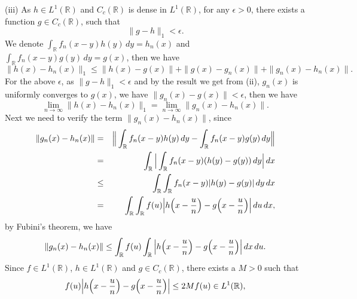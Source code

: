 \documentclass[12pt,a4paper]{ctexart}
\begin{document}
\vspace{4pt}

(iii) As $h \in L^{1}(\mathbb{R})$ and $C_{c} (\mathbb{R})$ is dense in $L^{1} (\mathbb{R})$, for any $\epsilon > 0$, there exists  a function $g \in C_{c}(\mathbb{R})$, such that
\begin{equation*}
    \|g - h\|_{1} < \epsilon.
\end{equation*}
We denote $\int_{\mathbb{R}}^{} f_{n} (x - y) h(y) \, d y = h_{n}(x)$ and $\int_{\mathbb{R}}^{} f_{n} (x - y) g(y) \, d y = g(x)$, then we have
\begin{equation*}
    \|h(x) - h_{n}(x)\|_{1} \leq \|h(x) - g(x)\| + \|g(x) - g_{n}(x)\| + \|g_{n}(x) - h_{n}(x)\|.
\end{equation*}
For the above $\epsilon$, as $\|g - h\|_{1} < \epsilon$ and by the result we get from (ii), $g_{n}(x)$ is uniformly converges to $g(x)$, we have $\|g_{n}(x) - g(x)\| < \epsilon$, then we have
\begin{equation*}
    \lim_{n \to \infty} \|h(x) - h_{n}(x)\|_{1} = \lim_{n \to \infty} \|g_{n}(x) - h_{n}(x)\|.
\end{equation*}
Next we need to verify the term $\|g_{n}(x) - h_{n}(x)\|$, since
\begin{eqnarray*}
    \|g_{n}(x) - h_{n}(x)\| & = & \Big{\|} \int_{\mathbb{R}}^{} f_{n} (x - y) h(y) \, d y - \int_{\mathbb{R}}^{} f_{n} (x - y) g(y) \, d y \Big{\|} \\
    & = & \int_{\mathbb{R}}^{} \Big{|}  \int_{\mathbb{R}}^{} f_{n} (x - y) ( h(y) - g(y)) \, d y \Big{|} \, d x \\
    & \leq & \int_{\mathbb{R}}^{} \int_{\mathbb{R}}^{} f_{n} (x - y) | h(y) - g(y)| \, d y \, d x \\
    & = & \int_{\mathbb{R}}^{} \int_{\mathbb{R}}^{} f (u) \Big{|} h \Big{(} x - \frac{u}{n} \Big{)} - g \Big{(} x - \frac{u}{n} \Big{)} \Big{|} \, d u \, d x,
\end{eqnarray*}
by Fubini's theorem, we have
\begin{equation*}
    \|g_{n}(x) - h_{n}(x)\| \leq \int_{\mathbb{R}}^{} f (u)  \int_{\mathbb{R}}^{}  \Big{|} h \Big{(} x - \frac{u}{n} \Big{)} - g \Big{(} x - \frac{u}{n} \Big{)} \Big{|} \, d x \, d u.
\end{equation*}
Since $f \in L^{1}(\mathbb{R})$, $h \in L^{1}(\mathbb{R})$ and $g \in C_{c}(\mathbb{R})$, there exists a $M > 0$ such that 
\begin{equation*}
    f (u) \Big{|} h \Big{(} x - \frac{u}{n} \Big{)} - g \Big{(} x - \frac{u}{n} \Big{)} \Big{|} \leq 2 M f(u) \in L^{1}(\mathbb{R}),
\end{equation*}
\end{document}
